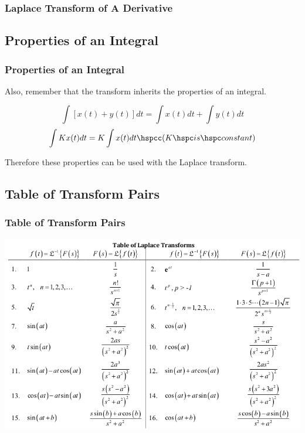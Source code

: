 \documentclass[fleqn]{beamer} %
\newcommand{\sectionIsubsectionIItitle}{Laplace Transform of A Derivative}
\newcommand{\sectionIsubsectionIIItitle}{Properties of an Integral}
\newcommand{\sectionIsubsectionIVtitle}{Table of Transform Pairs}
\begin{document}
			\begin{frame}
				\frametitle{\sectionIsubsectionIItitle}
				\bigskip
				

				  
		
				\btVFill
			\end{frame}

		\subsection{\sectionIsubsectionIIItitle}\label{sectionIsubsectionIII}
			\begin{frame} 
				\frametitle{\sectionIsubsectionIIItitle}
				\bigskip

				Also, remember that the transform inherits the properties of an integral.

				\[ \int\left[ x(t)+y(t) \right]dt =\int x(t)dt + \int y(t)dt \]
				\[ \int Kx(t)dt = K\int x(t)dt \hspcc (K \hspc is \hspc constant)\]

				Therefore these properties can be used with the Laplace transform.	
								
				\btVFill
			\end{frame}	


		\subsection{\sectionIsubsectionIVtitle}\label{sectionIsubsectionIV}

			\begin{frame}
				\frametitle{\sectionIsubsectionIVtitle}
				\bigskip

				\includegraphics[scale=.35]{images/laplace_table_part1.png}
					
				\btVFill
			\end{frame}	
\end{document}
